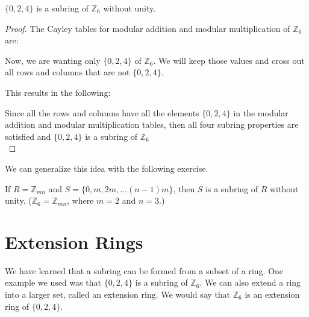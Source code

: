 \begin{example}
$\{0,2,4\}$ is a subring of ${\mathbb Z}_6$ without unity.\\

\begin{proof}
The Cayley tables for modular addition and modular multiplication of ${\mathbb Z}_6$ are:\\

\begin{figure}[H]
\end{figure}

Now, we are wanting only $\{0,2,4\}$ of ${\mathbb Z}_6$. We will keep those values and cross out all rows and columns that are not $\{0,2,4\}$. \\

\begin{figure}[H]
\end{figure}

This results in the following:

\begin{figure}[H]
\end{figure}

Since all the rows and columns have all the elements $\{0,2,4\}$ in the modular addition and modular multiplication tables, then all four subring properties are satisfied and  $\{0,2,4\}$ is a subring of ${\mathbb Z}_6$\\
\end{proof}
\end{example}

We can generalize this idea with the following exercise.

\begin{exercise}
If $R={\mathbb Z}_{mn}$ and $S=\{0,m,2m,...(n-1)m\}$, then $S$ is a subring of $R$ without unity. (${\mathbb Z}_6={\mathbb Z}_{mn}$, where $m=2$ and $n=3$.)  
\end{exercise}

\section{Extension Rings}
\label{sec:extensionRings}

We have learned that a subring can be formed from a subset of a ring. One example we used was that $\{0,2,4\}$ is a subring of ${\mathbb Z}_6$. We can also extend a ring into a larger set, called an extension ring.  We would say that ${\mathbb Z}_6$ is an extension ring of $\{0,2,4\}$.

